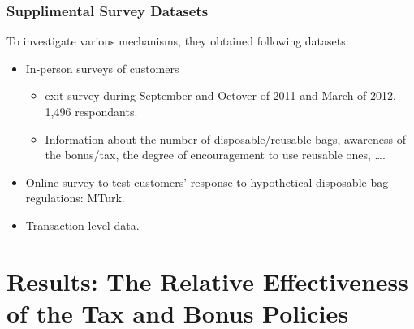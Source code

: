 \documentclass[dvipdfmx,11pt]{beamer}
\begin{document}
\begin{frame}\frametitle{Supplimental Survey Datasets}
  To investigate various mechanisms, they obtained following datasets:
  \begin{itemize}
    \item In-person surveys of customers
    \begin{itemize}
      \item exit-survey during September and Octover of 2011 and March of 2012, 1,496 respondants.
      \item Information about the number of disposable/reusable bags, awareness of the bonus/tax, the degree of encouragement to use reusable ones, \ldots.
    \end{itemize}
    \item Online survey to test customers' response to hypothetical disposable bag regulations: MTurk.
    \item Transaction-level data.
  \end{itemize}
\end{frame}

\section{Results: The Relative Effectiveness of the Tax and Bonus Policies}
\frame{\sectionpage}
\end{document}
